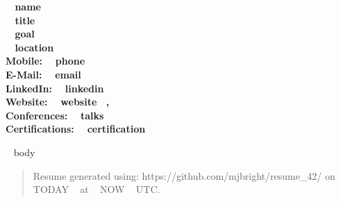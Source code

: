 \documentclass[11pt,english]{article}
\begin{document}

\begin{center}
\huge\bf\color{maincolor} ~{{ name }}~  \\
\small\color{black} ~{{ title }}~ \\
\small\color{black} ~{{ goal }}~ \\
\small\color{black} ~{{ location }}~ \\ \small\color{black} Mobile: ~{{ phone }}~ \\
\vspace{1.4mm}
\small\color{black} E-Mail: ~{{ email }}~ \\
\small\color{black} LinkedIn: ~{{ linkedin }}~ \\
\vspace{1.4mm}
\small\color{black} Website: ~{{ website }}~, \\
\small\color{black} Conferences: ~{{ talks }}~ \\
\vspace{1.4mm}
\small\color{black} Certifications: ~{{ certification }}~
\end{center}
\vspace{0.1mm}
~{{ body }}~

\vfill
\noindent\makebox[\linewidth]{\rule{\paperwidth}{0.4pt}}

\begin{quotation}
\small Resume generated using: https://github.com/mjbright/resume\_42/ on ~{{ TODAY }}~ at ~{{ NOW }}~ UTC.
\end{quotation}
\end{document}
